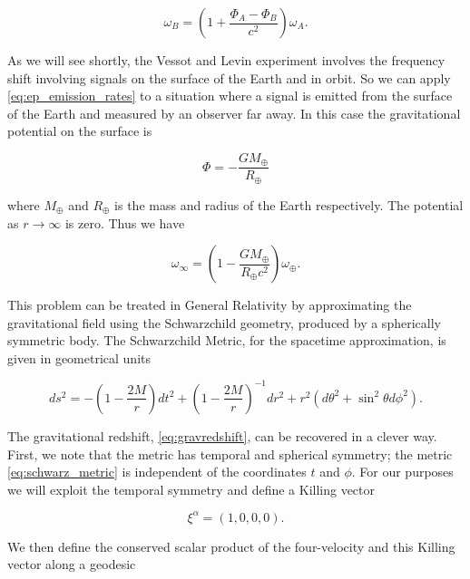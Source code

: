 \documentclass[11pt]{article}
\begin{document}
\begin{equation}
    \label{eq:ep_emission_rates}
    \omega_B = \left(1 + \frac{\Phi_A - \Phi_B}{c^2}\right) \omega_A.
\end{equation}

As we will see shortly, the Vessot and Levin experiment involves the frequency shift involving signals on the surface of the Earth and in orbit. So we can apply \eqref{eq:ep_emission_rates} to a situation where a signal is emitted from the surface of the Earth and measured by an observer far away. In this case the gravitational potential on the surface is

\begin{equation}
    \Phi= -\frac{GM_{\oplus}}{R_{\oplus}}
\end{equation}

where $M_{\oplus}$ and $R_{\oplus}$ is the mass and radius of the Earth respectively. The potential as $r \rightarrow \infty$ is zero. Thus we have

\begin{equation}
    \label{eq:gravredshift}
    \omega_{\infty} = \left(1 - \frac{GM_{\oplus}}{R_{\oplus}c^2}\right) \omega_{\oplus}.
\end{equation}

This problem can be treated in General Relativity by approximating the gravitational field using the Schwarzchild geometry, produced by a spherically symmetric body. The Schwarzchild Metric, for the spacetime approximation, is given in geometrical units

\begin{equation}
    \label{eq:schwarz_metric}
    ds^2 = -\left(1 - \frac{2M}{r}\right)dt^2 + \left(1 - \frac{2M}{r}\right)^{-1} dr^2 + r^2(d\theta^2 + \sin^2\theta d\phi^2).
\end{equation}

The gravitational redshift, \eqref{eq:gravredshift}, can be recovered in a clever way. First, we note that the metric has temporal and spherical symmetry; the metric \eqref{eq:schwarz_metric} is independent of the coordinates $t$ and $\phi$. For our purposes we will exploit the temporal symmetry and define a Killing vector

\begin{equation}
    \label{eq:killing_components}
    \xi^\alpha = (1, 0, 0, 0).
\end{equation}

We then define the conserved scalar product of the four-velocity and this Killing vector along a geodesic
\end{document}
